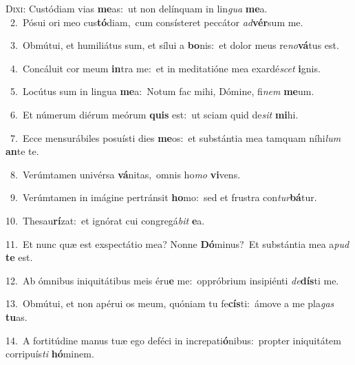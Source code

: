 \lettrine{\initial\textcolor{\initialcolor}{D}}{ixi:} Custódiam vias \textbf{me}\-as:~\star ut non delínquam in lin\textit{gua} \textbf{me}\-a.\\
{\numbfont\textcolor{\numbcolor}{~2.}}~Pósui ori meo cus\-\textbf{tó}\-diam,~\star cum consísteret peccátor \textit{ad}\-\textbf{vér}sum me.\par
{\numbfont\textcolor{\numbcolor}{~3.}}~Obmútui, et humiliátus sum, et sílui a \textbf{bo}\-nis:~\star et dolor meus re\-\textit{no}\-\textbf{vá}tus est.\par
{\numbfont\textcolor{\numbcolor}{~4.}}~Concáluit cor meum \textbf{in}\-tra me:~\star et in meditatióne mea exardé\textit{scet} \textbf{i}\-gnis.\par
{\numbfont\textcolor{\numbcolor}{~5.}}~Locútus sum in lingua \textbf{me}\-a:~\star Notum fac mihi, Dómine, fi\textit{nem} \textbf{me}\-um.\par
{\numbfont\textcolor{\numbcolor}{~6.}}~Et númerum diérum meórum \textbf{quis} est:~\star ut sciam quid de\textit{sit} \textbf{mi}\-hi.\par
{\numbfont\textcolor{\numbcolor}{~7.}}~Ecce mensurábiles posuísti dies \textbf{me}\-os:~\star et substántia mea tamquam níhi\textit{lum} \textbf{an}\-te te.\par
{\numbfont\textcolor{\numbcolor}{~8.}}~Verúmtamen univérsa \textbf{vá}\-nitas,~\star omnis ho\textit{mo} \textbf{vi}\-vens.\par
{\numbfont\textcolor{\numbcolor}{~9.}}~Verúmtamen in imágine pertránsit \textbf{ho}\-mo:~\star sed et frustra con\-\textit{tur}\-\textbf{bá}tur.\par
{\numbfont\textcolor{\numbcolor}{10.}}~Thesau\-\textbf{rí}\-zat:~\star et ignórat cui congregá\textit{bit} \textbf{e}\-a.\par
{\numbfont\textcolor{\numbcolor}{11.}}~Et nunc quæ est exspectátio mea? Nonne \textbf{Dó}\-minus?~\star Et substántia mea a\textit{pud} \textbf{te} est.\par
{\numbfont\textcolor{\numbcolor}{12.}}~Ab ómnibus iniquitátibus meis éru\textbf{e} me:~\star oppróbrium insipiénti \textit{de}\-\textbf{dís}ti me.\par
{\numbfont\textcolor{\numbcolor}{13.}}~Obmútui, et non apérui os meum, quóniam tu fe\-\textbf{cís}\-ti:~\star ámove a me pla\textit{gas} \textbf{tu}\-as.\par
{\numbfont\textcolor{\numbcolor}{14.}}~A fortitúdine manus tuæ ego deféci in increpati\-\textbf{ó}\-nibus:~\star propter iniquitátem corripuís\textit{ti} \textbf{hó}\-minem.\par
